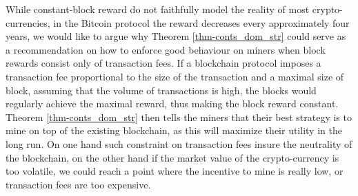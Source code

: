 While constant-block reward do not faithfully model the reality of most crypto-currencies, in the Bitcoin protocol the reward decreases every approximately four years, we would like to argue why Theorem \ref{thm-conts_dom_str} could serve as a recommendation on how to enforce good behaviour on miners when block rewards consist only of transaction fees. If a blockchain protocol imposes a transaction fee proportional to the size of the transaction and a maximal size of block, assuming that the volume of transactions is high, the blocks would regularly achieve the maximal reward, thus making the block reward constant. Theorem  \ref{thm-conts_dom_str} then tells the miners that their best strategy is to mine on top of the existing blockchain, as this will maximize their utility in the long run. On one hand such constraint on transaction fees insure the neutrality of the blockchain, on the other hand if the market value of the crypto-currency is too volatile, we could reach a point where the incentive to mine is really low, or transaction fees are too expensive. 
%
%
%

